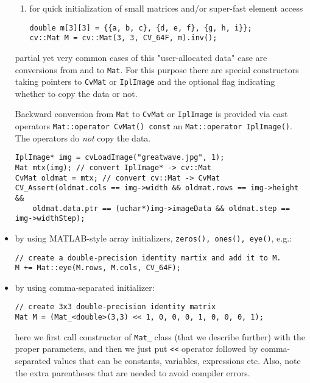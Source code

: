 \begin{itemize}
\begin{enumerate}
        \item for quick initialization of small matrices and/or super-fast element access
\begin{lstlisting}
double m[3][3] = {{a, b, c}, {d, e, f}, {g, h, i}};
cv::Mat M = cv::Mat(3, 3, CV_64F, m).inv();
\end{lstlisting}
        \end{enumerate}
        
        partial yet very common cases of this "user-allocated data" case are conversions
        from  and  to \texttt{Mat}. For this purpose there are special constructors
        taking pointers to \texttt{CvMat} or \texttt{IplImage} and the optional
        flag indicating whether to copy the data or not.
        
        Backward conversion from \texttt{Mat} to \texttt{CvMat} or \texttt{IplImage} is provided via cast operators
        \texttt{Mat::operator CvMat() const} an \texttt{Mat::operator IplImage()}.
        The operators do \emph{not} copy the data.
        
\begin{lstlisting}
IplImage* img = cvLoadImage("greatwave.jpg", 1);
Mat mtx(img); // convert IplImage* -> cv::Mat
CvMat oldmat = mtx; // convert cv::Mat -> CvMat
CV_Assert(oldmat.cols == img->width && oldmat.rows == img->height &&
    oldmat.data.ptr == (uchar*)img->imageData && oldmat.step == img->widthStep);
\end{lstlisting}
        
\item by using MATLAB-style array initializers, \texttt{zeros(), ones(), eye()}, e.g.:

\begin{lstlisting}
// create a double-precision identity martix and add it to M.
M += Mat::eye(M.rows, M.cols, CV_64F);
\end{lstlisting}

\item by using comma-separated initializer:
\begin{lstlisting}
// create 3x3 double-precision identity matrix
Mat M = (Mat_<double>(3,3) << 1, 0, 0, 0, 1, 0, 0, 0, 1);
\end{lstlisting}

here we first call constructor of \texttt{Mat\_} class (that we describe further) with the proper parameters, and then we just put \texttt{<<} operator followed by comma-separated values that can be constants, variables, expressions etc. Also, note the extra parentheses that are needed to avoid compiler errors.
       
\end{itemize}

